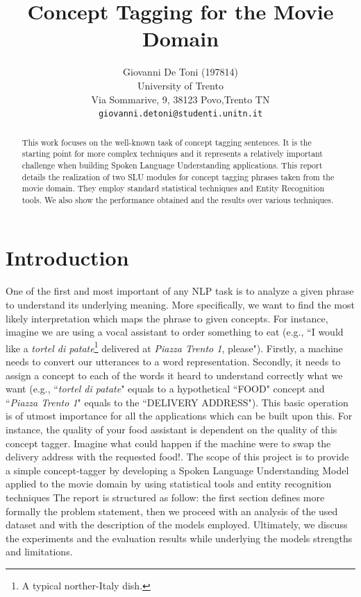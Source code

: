 \documentclass[11pt,a4paper]{article}
\title{Concept Tagging for the Movie Domain}
\author{Giovanni De Toni (197814) \\
  University of Trento \\ Via Sommarive, 9, 38123 Povo,Trento TN\\
  \texttt{giovanni.detoni@studenti.unitn.it}}
\date{}
\begin{document}
\maketitle

\begin{abstract}
This work focuses on the well-known task of concept tagging sentences.  It is the starting point for more complex techniques and it represents a relatively important challenge when building Spoken Language Understanding applications. This report details the realization of two SLU modules for concept tagging phrases taken from the movie domain. They employ standard statistical techniques and Entity Recognition tools. We also show the performance obtained and the results over various techniques.
\end{abstract}

\section{Introduction}
One of the first and most important of any NLP task is to analyze a given phrase to understand its underlying meaning. More specifically, we want to find the most likely interpretation which maps the phrase to given concepts. For instance, imagine we are using a vocal assistant to order something to eat (e.g., ``I would like a \textit{tortel di patate}\footnote{A typical norther-Italy dish.} delivered at \textit{Piazza Trento 1}, please"). Firstly, a machine needs to convert our utterances to a word representation. Secondly, it needs to assign a concept to each of the words it heard to understand correctly what we want (e.g., ``\textit{tortel di patate}" equals to a hypothetical ``FOOD" concept and ``\textit{Piazza Trento 1}" equals to the ``DELIVERY ADDRESS").
This basic operation is of utmost importance for all the applications which can be built upon this. For instance, the quality of your food assistant is dependent on the quality of this concept tagger. Imagine what could happen if the machine were to swap the delivery address with the requested food!.  
The scope of this project is to provide a simple concept-tagger by developing a Spoken Language Understanding Model applied to the movie domain by using statistical tools and entity recognition techniques
The report is structured as follow: the first section defines more formally the problem statement, then we proceed with an analysis of the used dataset and with the description of the models employed. Ultimately, we discuss the experiments and the evaluation results while underlying the models strengths and limitations.
\end{document}
